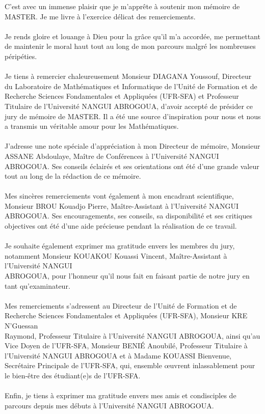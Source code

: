 C’est avec un immense plaisir que je m’apprête à soutenir mon mémoire de \\ MASTER. Je me livre à l’exercice délicat des remerciements.\\\\
Je rends gloire et louange à Dieu pour la grâce qu’il m’a accordée, me permettant de maintenir le moral haut tout au long de mon parcours malgré les nombreuses \\ péripéties.\\\\
Je tiens à remercier chaleureusement Monsieur DIAGANA Youssouf, Directeur du Laboratoire de Mathématiques et Informatique de l’Unité de Formation et de\\ Recherche Sciences Fondamentales et Appliquées (UFR-SFA) et Professeur Titulaire de l’Université NANGUI ABROGOUA, d’avoir accepté de présider ce jury de mémoire de MASTER. Il a été une source d’inspiration pour nous et nous a transmis un véritable amour pour les Mathématiques.\\\\
J’adresse une note spéciale d’appréciation à mon Directeur de mémoire, Monsieur ASSANE Abdoulaye, Maître de Conférences à l’Université NANGUI ABROGOUA. Ses conseils éclairés et ses orientations ont été d’une grande valeur tout au long de la rédaction de ce mémoire.\\\\
Mes sincères remerciements vont également à mon encadrant scientifique, Monsieur BROU Kouadjo Pierre, Maître-Assistant à l’Université NANGUI ABROGOUA. Ses encouragements, ses conseils, sa disponibilité et ses critiques objectives ont été d’une aide précieuse pendant la réalisation de ce travail.\\\\
Je souhaite également exprimer ma gratitude envers les membres du jury, notamment Monsieur KOUAKOU Kouassi Vincent, Maître-Assistant à l’Université NANGUI \\ ABROGOUA, pour l’honneur qu’il nous fait en faisant partie de notre jury en tant qu’examinateur.\\\\
Mes remerciements s’adressent au Directeur de l’Unité de Formation et de Recherche Sciences Fondamentales et Appliquées (UFR-SFA), Monsieur KRE N’Guessan \\ Raymond, Professeur Titulaire à l’Université NANGUI ABROGOUA, ainsi qu’au Vice Doyen de l’UFR-SFA, Monsieur BENIÉ Anoubilé, Professeur Titulaire à l’Université NANGUI ABROGOUA et à Madame KOUASSI Bienvenue, Secrétaire Principale de l’UFR-SFA, qui, ensemble œuvrent inlassablement pour le bien-être des étudiant(e)s de l’UFR-SFA.\\\\
Enfin, je tiens à exprimer ma gratitude envers mes amis et condisciples de parcours depuis mes débuts à l’Université NANGUI ABROGOUA.
